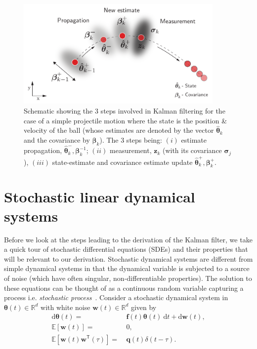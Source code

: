 \documentclass{resonance}
\def\R{\mathbb{R}}
\def\d{\text{d}}
\def\E{\mathbb{E}}
\def\x{\bm{\theta}}
\def\thh{\bm{\hat{\theta}}}
\def\z{\mathbf{z}}
\def\f{\bm{f}}
\def\w{\mathbf{w}}
\def\q{\mathbf{q}}
\def\p{\bm{\beta}}
\def\T{\mathsf{T}}
\def\S{\bm{\sigma}}
\def\E{\mathbb{E}}
\begin{document}
\begin{figure}
    \centering
    \includegraphics[width=0.9\textwidth]{./figs/KFSchematic.pdf}
    \caption{Schematic showing the 3 steps involved in Kalman filtering for the case of a simple projectile motion where the state is the position \& velocity of the ball (whose estimates are denoted by the vector $\thh_k$ and the covariance by $\p_k$). The 3 steps being: $(i)$ estimate propagation, $\thh_k^{-}, \p_k^{-1}$; $(ii)$ measurement, $\z_k$ (with its covariance $\S_j$), $(iii)$ state-estimate and covariance estimate update $\thh_k^{+}, \p_k^{+}$.}
    \label{fig:KFschm}
\end{figure}

\section{Stochastic linear dynamical systems}\label{sec:sde}
Before we look at the steps leading to the derivation of the Kalman filter, we take a quick tour of stochastic differential equations (SDEs) and their properties that will be relevant to our derivation. Stochastic dynamical systems are different from simple dynamical systems in that the dynamical variable is subjected to a source of noise (which have often singular, non-differentiable properties). The solution to these equations can be thought of as a continuous random variable capturing a process i.e. \textit{stochastic process}~\cite{balakrishnan2008elements}. Consider a stochastic dynamical system in $\x(t) \in \R^d$ with white noise $\w(t) \in \R^d$ given by
\begin{align}
\d \x(t) =& \ \f(t) \x(t) \ \d t + \d \w(t), \label{eq:sdeEq} \\
\E [\w(t)] =& \ 0, \\
\E [\w(t) \w^\T(\tau)] =& \ \q(t) \delta (t-\tau).
\end{align}
\end{document}
